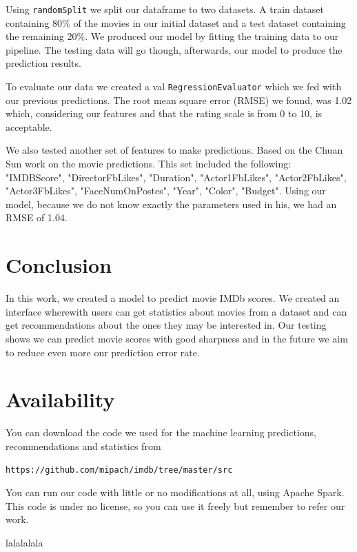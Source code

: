 \documentclass[letterpaper,twocolumn,10pt]{article}
\begin{document}
Using \texttt{randomSplit} we split our dataframe to two datasets. A train dataset containing 80\% of the movies in our initial dataset and a test dataset containing the remaining 20\%. We produced our model by fitting the training data to our pipeline. The testing data will go though, afterwards, our model to produce the prediction results.\par 

To evaluate our data we created a val \texttt{RegressionEvaluator} which we fed with our previous predictions. The root mean square error (RMSE) we found, was 1.02 which, considering our features and that the rating scale is from 0 to 10, is acceptable.

We also tested another set of features to make predictions. Based on the Chuan Sun work on the movie predictions. This set included the following: "IMDBScore", "DirectorFbLikes", "Duration", "Actor1FbLikes", "Actor2FbLikes", "Actor3FbLikes", "FaceNumOnPostes", "Year", "Color", "Budget". Using our model, because we do not know exactly the parameters used in his, we had an RMSE of 1.04. 
\section{Conclusion}

In this work, we created a model to predict movie IMDb scores. We created an interface wherewith users can get statistics about movies from a dataset and can get recommendations about the ones they may be interested in. Our testing shows we can predict movie scores with good sharpness and in the future we aim to reduce even more our prediction error rate.  

\section{Availability}

You can download the code we used for the machine learning predictions, recommendations and statistics from

\begin{center}
{\tt https://github.com/mipach/imdb/tree/master/src}\\
\end{center}

You can run our code with little or no modifications at all, using Apache Spark. This code is under no license, so you can use it freely but remember to refer our work.


{\footnotesize 
}
lalalalala
\end{document}
